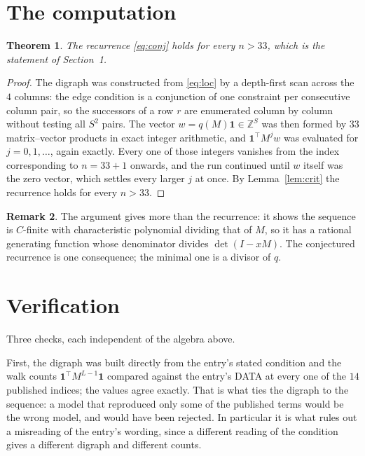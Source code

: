 \documentclass[11pt,a4paper]{article}
\theoremstyle{plain}
\newtheorem{theorem}{Theorem}
\theoremstyle{definition}
\newtheorem{remark}[theorem]{Remark}
\begin{document}
\section{The computation}

\begin{theorem}
The recurrence \eqref{eq:conj} holds for every $n>33$, which is the statement of
Section~1.
\end{theorem}

\begin{proof}
The digraph was constructed from \eqref{eq:loc} by a depth-first scan across the $4$
columns: the edge condition is a conjunction of one constraint per consecutive column
pair, so the successors of a row $r$ are enumerated column by column without testing all
$S^2$ pairs. The vector $w=q(M)\mathbf{1}\in\mathbb{Z}^{S}$ was then formed by $33$
matrix--vector products in exact integer arithmetic, and $\mathbf{1}^{\!\top}M^{j}w$ was
evaluated for $j=0,1,\dots$, again exactly. Every one of those integers vanishes from the
index corresponding to $n=33+1$ onwards, and the run continued until $w$ itself was the
zero vector, which settles every larger $j$ at once. By Lemma~\ref{lem:crit} the recurrence
holds for every $n>33$.
\end{proof}

\begin{remark}
The argument gives more than the recurrence: it shows the sequence is $C$-finite with
characteristic polynomial dividing that of $M$, so it has a rational generating function
whose denominator divides $\det(I-xM)$. The conjectured recurrence is one consequence; the
minimal one is a divisor of $q$.
\end{remark}

\section{Verification}

Three checks, each independent of the algebra above.

First, the digraph was built directly from the entry's stated condition and the walk counts
$\mathbf{1}^{\!\top}M^{L-1}\mathbf{1}$ compared against the entry's DATA at
every one of the $14$ published indices; the values agree exactly. That is what ties
the digraph to the sequence: a model that reproduced only some of the published terms would
be the wrong model, and would have been rejected. In particular it is what rules out a
misreading of the entry's wording, since a different reading of the condition gives a
different digraph and different counts.
\end{document}
